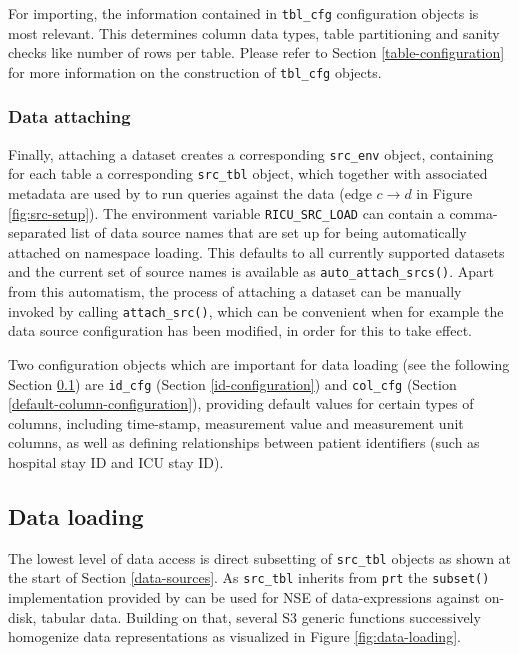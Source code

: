 \documentclass[
  notitle]{jss}
\begin{document}
For importing, the information contained in \texttt{tbl\_cfg}
configuration objects is most relevant. This determines column data
types, table partitioning and sanity checks like number of rows per
table. Please refer to Section \ref{table-configuration} for more
information on the construction of \texttt{tbl\_cfg} objects.

\hypertarget{data-attaching}{%
\subsubsection{Data attaching}\label{data-attaching}}

Finally, attaching a dataset creates a corresponding \texttt{src\_env}
object, containing for each table a corresponding \texttt{src\_tbl}
object, which together with associated metadata are used by 
to run queries against the data (edge \(c \to d\) in Figure
\ref{fig:src-setup}). The environment variable \texttt{RICU\_SRC\_LOAD}
can contain a comma-separated list of data source names that are set up
for being automatically attached on namespace loading. This defaults to
all currently supported datasets and the current set of source names is
available as \texttt{auto\_attach\_srcs()}. Apart from this automatism,
the process of attaching a dataset can be manually invoked by calling
\texttt{attach\_src()}, which can be convenient when for example the
data source configuration has been modified, in order for this to take
effect.

Two configuration objects which are important for data loading (see the
following Section \ref{data-loading}) are \texttt{id\_cfg} (Section
\ref{id-configuration}) and \texttt{col\_cfg} (Section
\ref{default-column-configuration}), providing default values for
certain types of columns, including time-stamp, measurement value and
measurement unit columns, as well as defining relationships between
patient identifiers (such as hospital stay ID and ICU stay ID).

\hypertarget{data-loading}{%
\subsection{Data loading}\label{data-loading}}

The lowest level of data access is direct subsetting of
\texttt{src\_tbl} objects as shown at the start of Section
\ref{data-sources}. As \texttt{src\_tbl} inherits from \texttt{prt} the
\texttt{subset()} implementation provided by  can be used for
NSE of data-expressions against on-disk, tabular data. Building on that,
several S3 generic functions successively homogenize data
representations as visualized in Figure \ref{fig:data-loading}.
\end{document}
